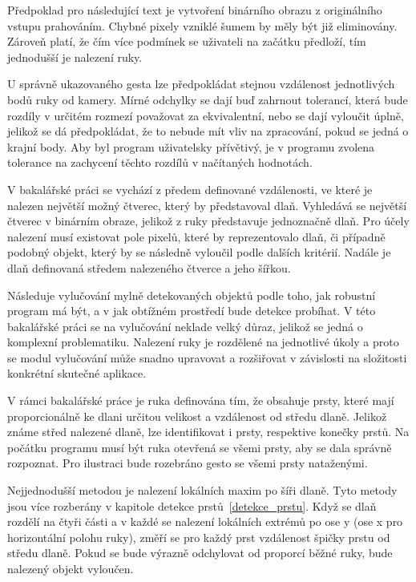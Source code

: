 Předpoklad pro následující text je vytvoření binárního obrazu z originálního vstupu prahováním. Chybné pixely vzniklé šumem by měly být již eliminovány. Zároveň platí, že čím více podmínek se uživateli na začátku předloží, tím jednodušší je nalezení ruky. %

U správně ukazovaného gesta lze předpokládat stejnou vzdálenost jednotlivých bodů ruky od kamery. Mírné odchylky se dají buď zahrnout tolerancí, která bude rozdíly v určitém rozmezí považovat za ekvivalentní, nebo se dají vyloučit úplně, jelikož se dá předpokládat, že to nebude mít vliv na zpracování, pokud se jedná o krajní body. Aby byl program uživatelsky přívětivý, je v programu zvolena tolerance na zachycení těchto rozdílů v načítaných hodnotách.

V bakalářské práci se vychází z předem definované vzdálenosti, ve které je nalezen největší možný čtverec, který by představoval dlaň. Vyhledává se největší čtverec v binárním obraze, jelikož z ruky představuje jednoznačně dlaň. Pro účely nalezení musí existovat pole pixelů, které by reprezentovalo dlaň, či případně podobný objekt, který by se následně vyloučil podle dalších kritérií. Nadále je dlaň definovaná středem nalezeného čtverce a jeho šířkou.

Následuje vylučování mylně detekovaných objektů podle toho, jak robustní program má být, a v jak obtížném prostředí bude detekce probíhat. V této bakalářské práci se na vylučování neklade velký důraz, jelikož se jedná o komplexní problematiku. Nalezení ruky je rozdělené na jednotlivé úkoly a proto se modul vylučování může snadno upravovat a rozšiřovat v závislosti na složitosti konkrétní skutečné aplikace.

V rámci bakalářské práce je ruka definována tím, že obsahuje prsty, které mají proporcionálně ke dlani určitou velikost a vzdálenost od středu dlaně. Jelikož známe střed nalezené dlaně, lze identifikovat i prsty, respektive konečky prstů. Na počátku programu musí být ruka otevřená se všemi prsty, aby se dala správně rozpoznat. Pro ilustraci bude rozebráno gesto se všemi prsty nataženými. 

Nejjednodušší metodou je nalezení lokálních maxim po šíři dlaně. Tyto metody jsou více rozberány v kapitole detekce prstů~\ref{detekce_prstu}. Když se dlaň rozdělí na čtyři části a v každé se nalezení lokálních extrémů po ose y (ose x pro horizontální polohu ruky), změří se pro každý prst vzdálenost špičky prstu od středu dlaně. Pokud se bude výrazně odchylovat od proporcí běžné ruky, bude nalezený objekt vyloučen.

